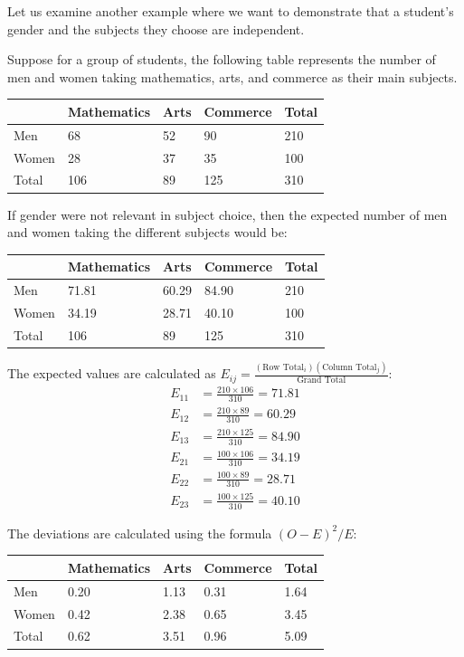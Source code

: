 Let us examine another example where we want to demonstrate that a student's gender and the subjects they choose are independent.

Suppose for a group of students, the following table represents the number of men and women taking mathematics, arts, and commerce as their main subjects.

\begin{center}
	\begin{tabular}{|l|l|l|l|l|}\hline
		& Mathematics & Arts & Commerce & Total\\\hline
		Men & 68 & 52 & 90 & 210\\\hline
		Women & 28 & 37 & 35 & 100\\\hline
		Total & 106 & 89 & 125 & 310\\\hline
	\end{tabular}
\end{center}

If gender were not relevant in subject choice, then the expected number of men and women taking the different subjects would be:
\begin{center}
	\begin{tabular}{|l|l|l|l|l|}\hline
		& Mathematics & Arts & Commerce & Total\\\hline
		Men & 71.81 & 60.29 & 84.90 & 210\\\hline
		Women & 34.19 & 28.71 & 40.10 & 100\\\hline
		Total & 106 & 89 & 125 & 310\\\hline
	\end{tabular}
\end{center}

The expected values are calculated as $E_{ij} = \frac{(\text{Row Total}_i)(\text{Column Total}_j)}{\text{Grand Total}}$:
\begin{align}
	E_{11} &= \frac{210 \times 106}{310} = 71.81 \\
	E_{12} &= \frac{210 \times 89}{310} = 60.29 \\
	E_{13} &= \frac{210 \times 125}{310} = 84.90 \\
	E_{21} &= \frac{100 \times 106}{310} = 34.19 \\
	E_{22} &= \frac{100 \times 89}{310} = 28.71 \\
	E_{23} &= \frac{100 \times 125}{310} = 40.10
\end{align}

The deviations are calculated using the formula $(O-E)^2/E$:
\begin{center}
	\begin{tabular}{|l|l|l|l|l|}\hline
		& Mathematics & Arts & Commerce & Total\\\hline
		Men & 0.20 & 1.13 & 0.31 & 1.64\\\hline
		Women & 0.42 & 2.38 & 0.65 & 3.45\\\hline
		Total & 0.62 & 3.51 & 0.96 & 5.09\\\hline
	\end{tabular}
\end{center}

